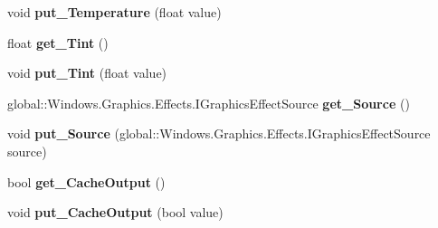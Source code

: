 \begin{DoxyCompactItemize}
void {\bfseries put\+\_\+\+Temperature} (float value)
\item 
\mbox{\label{class_microsoft_1_1_graphics_1_1_canvas_1_1_effects_1_1_temperature_and_tint_effect_a59625010f53353aeadc357e732f4b316}} 
float {\bfseries get\+\_\+\+Tint} ()
\item 
\mbox{\label{class_microsoft_1_1_graphics_1_1_canvas_1_1_effects_1_1_temperature_and_tint_effect_ac84f3870c687f56f7b661e60a685bac4}} 
void {\bfseries put\+\_\+\+Tint} (float value)
\item 
\mbox{\label{class_microsoft_1_1_graphics_1_1_canvas_1_1_effects_1_1_temperature_and_tint_effect_abbabd3d602c1135a09f9a6cb9f205e51}} 
global\+::\+Windows.\+Graphics.\+Effects.\+I\+Graphics\+Effect\+Source {\bfseries get\+\_\+\+Source} ()
\item 
\mbox{\label{class_microsoft_1_1_graphics_1_1_canvas_1_1_effects_1_1_temperature_and_tint_effect_a72294e2088f294cc1c29ae174184bafd}} 
void {\bfseries put\+\_\+\+Source} (global\+::\+Windows.\+Graphics.\+Effects.\+I\+Graphics\+Effect\+Source source)
\item 
\mbox{\label{class_microsoft_1_1_graphics_1_1_canvas_1_1_effects_1_1_temperature_and_tint_effect_a6506ba2d54d6a3609d276734e4406681}} 
bool {\bfseries get\+\_\+\+Cache\+Output} ()
\item 
\mbox{\label{class_microsoft_1_1_graphics_1_1_canvas_1_1_effects_1_1_temperature_and_tint_effect_ae78822024f1a6438879f484dc15e9632}} 
void {\bfseries put\+\_\+\+Cache\+Output} (bool value)
\item 
\mbox{\label{class_microsoft_1_1_graphics_1_1_canvas_1_1_effects_1_1_temperature_and_tint_effect_a8d0faf7638707a9f20470868d69fa811}} 

\end{DoxyCompactItemize}
